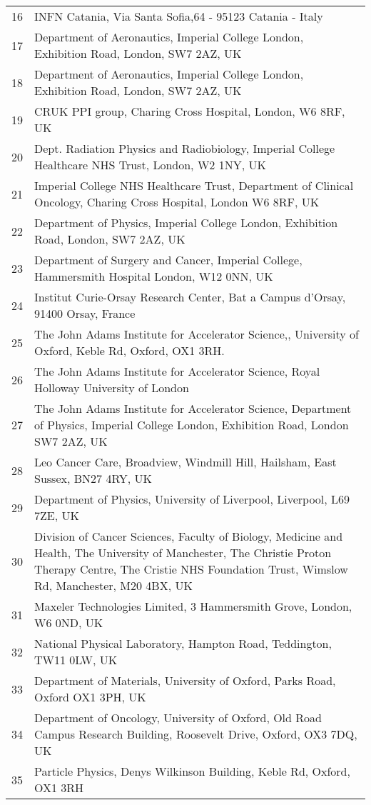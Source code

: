 {\begin{tabular}{ c p{15cm} }
     16 & INFN Catania, Via Santa Sofia,64 - 95123 Catania - Italy\\
     17 & Department of Aeronautics, Imperial College London, Exhibition Road, London, SW7 2AZ, UK\\
     18 & Department of Aeronautics, Imperial College London, Exhibition Road, London, SW7 2AZ, UK\\
     19 & CRUK PPI group, Charing Cross Hospital, London, W6 8RF, UK\\
     20 & Dept. Radiation Physics and Radiobiology, Imperial College Healthcare NHS Trust, London, W2 1NY, UK\\
     21 & Imperial College NHS Healthcare Trust, Department of Clinical Oncology, Charing Cross Hospital, London W6 8RF, UK\\
     22 & Department of Physics, Imperial College London, Exhibition Road, London, SW7 2AZ, UK\\
     23 & Department of Surgery and Cancer, Imperial College, Hammersmith Hospital London, W12 0NN, UK\\
     24 & Institut Curie-Orsay Research Center, Bat a Campus d'Orsay, 91400 Orsay, France\\
     25 & The John Adams Institute for Accelerator Science,, University of Oxford, Keble Rd, Oxford, OX1 3RH.\\
     26 & The John Adams Institute for Accelerator Science, Royal Holloway University of London\\
     27 & The John Adams Institute for Accelerator Science, Department of Physics, Imperial College London, Exhibition Road, London SW7 2AZ, UK\\
     28 & Leo Cancer Care, Broadview, Windmill Hill, Hailsham, East Sussex, BN27 4RY, UK\\
     29 & Department of Physics, University of Liverpool, Liverpool, L69 7ZE, UK\\
     30 & Division of Cancer Sciences, Faculty of Biology, Medicine and Health, The University of Manchester, The Christie Proton Therapy Centre, The Cristie NHS Foundation Trust, Wimslow Rd, Manchester, M20 4BX, UK\\
     31 & Maxeler Technologies Limited, 3 Hammersmith Grove, London, W6 0ND, UK\\
     32 & National Physical Laboratory, Hampton Road, Teddington, TW11 0LW, UK\\
     33 & Department of Materials, University of Oxford, Parks Road, Oxford OX1 3PH, UK\\
     34 & Department of Oncology, University of Oxford, Old Road Campus Research Building, Roosevelt Drive, Oxford, OX3 7DQ, UK\\
     35 & Particle Physics, Denys Wilkinson Building, Keble Rd, Oxford, OX1 3RH\\
  \end{tabular}
}
 
